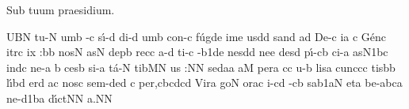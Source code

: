 
\beginhymn Sub tuum praesidium.

\Internote
\nosolesmescustos
\initiumgregorianum
{}%
\sgn {}UB\punctum N\egn
\spatium
\sgn tu-\punctum N\egn
\sgn {}um\punctum b\egn
\spatium
{}-\punctum c\egn
\sgn s{\'\i}-\punctum d\egn
\sgn d{i}-\punctum d\egn
\sgn {}um\punctum b\egn
\spatium
\sgn co{n-}\punctum c\egn
\sgn f{\'u}g\pes de\egn
\sgn {}im\punctum e\egn
\sgn {}us\punctum d\augmentum d\egn
\spatium
\divisiominima
\spatium
\sgn san\punctum d\egn
{}a{}\punctum d\egn
\spatium
\sgn De-\punctum c\egn
\sgn {}i{}\punctum a\egn
\custos c
\lineaproxima
\sgn G{\'e}n\punctum c\egn
\sgn {}i{tr}\punctum c\egn
\sgn {}i{x :}\punctum b\augmentum b\egn
\spatium
\divisiominor
\spatium
\sgn nos\punctum N\egn
{}as\punctum N\egn
\spatium
\sgn dep\punctum b\egn
\sgn rec\punctum c\egn
\sgn {}a-\punctum d\egn
\sgn ti-\punctum c\egn
{}-\episem b1\pes de\egn
\sgn nes\punctum d\augmentum d\egn
\spatium
\divisiominima
\spatium
\sgn ne{}\punctum e\egn
\spatium
\sgn des\punctum d\egn
\sgn p{\'\i}-\clivis cb\egn
\sgn ci-\punctum a\egn
\sgn {}as\episem N1\pes bc\egn
\spatium
\sgn {}in\cephalicus dc\egn
\spatium
\sgn ne{-}\punctum a\egn
\spatium
\custos b
\lineaproxima
\sgn ces\punctum b\egn
\sgn si-\punctum a\egn
\sgn t{\'a}-\punctum N\egn
\sgn tib\pes MN\egn
\sgn {}u{s :}\punctum N\augmentum N\egn
\spatium
\divisiomaior
\spatium
\sgn sed\punctum a\spatiumparvum\punctum a\egn
\spatium
\sgn {}a{}\punctum M\egn
\spatium
\sgn per\punctum a\egn
\sgn {}{\'\i}c\punctum c\egn
\sgn {}u-\punctum b\egn
\sgn lis\punctum a\egn
\spatium
\sgn cu{nc}\punctum c\spatiumparvum\punctum c\egn
\sgn tis\punctum b\augmentum b\egn
\spatium
\divisiominima
\spatium
\sgn l{\'\i}b\punctum d\egn
\sgn {}er\punctum d\egn
\sgn {}a{}\punctum c\egn
\spatium
\sgn nos\punctum c\egn
\spatium
\sgn se{m-}\torculus ded\egn
\custos c
\lineaproxima
\sgn pe{r,}\clivis cb\spatiumparvum\torculus cdc\augmentum d\egn
\spatium
\divisiominor
\spatium
\sgn Vir\punctum a\egn
\sgn go{}\punctum N\egn
\spatium
{}or\pes ac\egn
\sgn {}i-\pes cd\egn
{}-\clivis cb\egn
\sgn sa{}\episem b1\clivis aN\egn
\spatium
\divisiominima
\spatium
\sgn {}et\punctum a\egn
\spatium
\sgn be-\punctum a\nonspatium{}\quilismatorculus bca\egn
\sgn ne-\episem d1\clivis ba\egn
\sgn d{\'\i}{ct}\punctum N\augmentum N\egn
\sgn {}a.\punctum N\augmentum N\egn
\spatium
\Finisgregoriana
